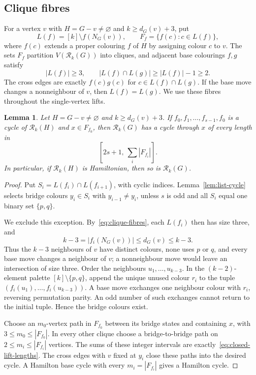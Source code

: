 \documentclass[11pt]{article}
\newtheorem{lemma}[theorem]{Lemma}
\theoremstyle{remark}
\newcommand{\Rk}{\mathcal R_k}
\numberwithin{equation}{section}
\numberwithin{table}{section}
\begin{document}
\subsection{Clique fibres}
For a vertex $v$ with $H=G-v\ne\varnothing$ and $k\ge d_G(v)+3$, put
\[
 L(f)=[k]\setminus f(N_G(v)),\qquad
 F_f=\{f(c):c\in L(f)\},
\]
where $f(c)$ extends a proper colouring $f$ of $H$ by assigning colour
$c$ to $v$. The sets $F_f$ partition $V(\Rk(G))$ into cliques, and
adjacent base colourings $f,g$ satisfy
\begin{equation}\label{eq:clique-fibres}
 |L(f)|\ge3,\qquad |L(f)\cap L(g)|\ge |L(f)|-1\ge2.
\end{equation}
The cross edges are exactly $f(c)g(c)$ for $c\in L(f)\cap L(g)$.
If the base move changes a nonneighbour of $v$, then $L(f)=L(g)$.
We use these fibres throughout the single-vertex lifts.

\begin{lemma}
\label{lem:single-lift}
Let $H=G-v\ne\varnothing$ and $k\ge d_G(v)+3$. If
$f_0,f_1,\ldots,f_{s-1},f_0$ is a cycle of $\Rk(H)$ and $x\in F_{f_0}$,
then $\Rk(G)$ has a cycle through $x$ of every length in
\begin{equation}\label{eq:closed-lift-lengths}
 [2s+1,\ \textstyle\sum_i|F_{f_i}|].
\end{equation}
In particular, if $\Rk(H)$ is Hamiltonian, then so is $\Rk(G)$.
\end{lemma}

\begin{proof}
Put $S_i=L(f_i)\cap L(f_{i+1})$, with cyclic indices.
Lemma~\ref{lem:list-cycle} selects bridge colours $y_i\in S_i$
with $y_{i-1}\ne y_i$, unless $s$ is odd and all $S_i$ equal
one binary set $\{p,q\}$.

We exclude this exception. By~\eqref{eq:clique-fibres}, each
$L(f_i)$ then has size three, and
\[
 k-3=|f_i(N_G(v))|\le d_G(v)\le k-3.
\]
Thus the $k-3$ neighbours of $v$ have distinct colours, none uses
$p$ or $q$, and every base move changes a neighbour of $v$;
a nonneighbour move would leave an intersection of size three.
Order the neighbours $u_1,\ldots,u_{k-3}$. In the $(k-2)$-element
palette $[k]\setminus\{p,q\}$, append the unique unused colour
$r_i$ to the tuple $(f_i(u_1),\ldots,f_i(u_{k-3}))$.
A base move exchanges one neighbour colour with $r_i$, reversing
permutation parity. An odd number of such exchanges cannot return
to the initial tuple. Hence the bridge colours exist.

Choose an $m_0$-vertex path in $F_{f_0}$ between its bridge states
and containing $x$, with $3\le m_0\le|F_{f_0}|$.
In every other clique choose a bridge-to-bridge path on
$2\le m_i\le|F_{f_i}|$ vertices. The sums of these integer intervals
are exactly~\eqref{eq:closed-lift-lengths}. The cross edges with $v$
fixed at $y_i$ close these paths into the desired cycle. A Hamilton
base cycle with every $m_i=|F_{f_i}|$ gives a Hamilton cycle.
\end{proof}
\end{document}
